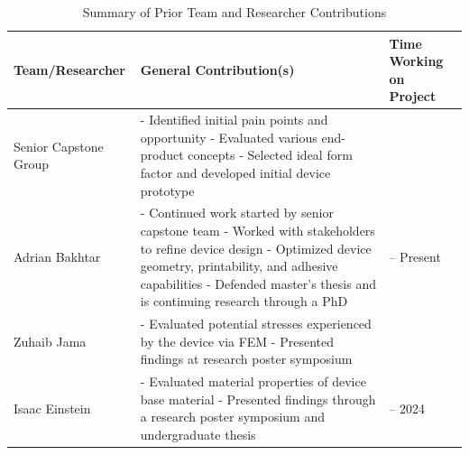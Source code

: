 \begin{table}[H]
        \centering
        \caption{Summary of Prior Team and Researcher Contributions}
        \label{tab:introduction:priorWorkCompletedOverview}
        \begin{tabularx}{\textwidth}{>{\raggedright\arraybackslash}p{3cm} X >{\raggedright\arraybackslash}p{3cm}}
                \toprule
                \textbf{Team/Researcher}                                       & \textbf{General Contribution(s)} & \textbf{Time Working on Project} \\
                \midrule
                Senior Capstone Group~\cite{RefWorks:RefID:372-krakovskytumor} &
                - Identified initial pain points and opportunity \newline
                - Evaluated various end-product concepts \newline
                - Selected ideal form factor and developed initial device prototype
                                                                               & 2022                                                                \\
                \addlinespace
                Adrian Bakhtar~\cite{RefWorks:RefID:371-bakhtardesign}         &
                - Continued work started by senior capstone team \newline
                - Worked with stakeholders to refine device design \newline
                - Optimized device geometry, printability, and adhesive capabilities \newline
                - Defended master's thesis and is continuing research through a PhD
                                                                               & 2022 -- Present                                                     \\
                \addlinespace
                Zuhaib Jama~\cite{RefWorks:RefID:384-jamacomputational}        &
                - Evaluated potential stresses experienced by the device via FEM \newline
                - Presented findings at research poster symposium
                                                                               & 2024                                                                \\
                \addlinespace
                Isaac Einstein~\cite{RefWorks:RefID:370-einsteinisaac}         &
                - Evaluated material properties of device base material \newline
                - Presented findings through a research poster symposium and undergraduate thesis
                                                                               & 2023 -- 2024                                                        \\
                \bottomrule
        \end{tabularx}
\end{table}

